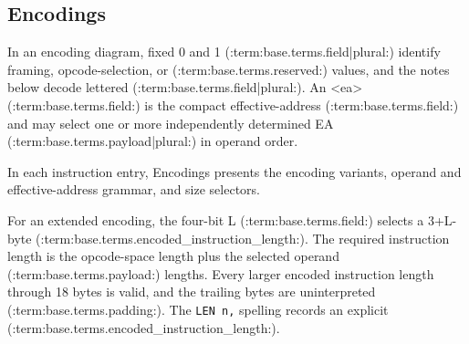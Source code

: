 \subsection*{Encodings}
In an encoding diagram, fixed 0 and 1 (:term:base.terms.field|plural:) identify framing, opcode-selection, or (:term:base.terms.reserved:) values, and the notes
below decode lettered (:term:base.terms.field|plural:). An <ea> (:term:base.terms.field:) is the compact effective-address (:term:base.terms.field:) and may select one or more
independently determined EA (:term:base.terms.payload|plural:) in operand order.

In each instruction entry, Encodings presents the encoding variants, operand and
effective-address grammar, and size selectors.

For an extended encoding, the four-bit L (:term:base.terms.field:) selects a 3+L-byte (:term:base.terms.encoded_instruction_length:). The required
instruction length is the opcode-space length plus the selected operand (:term:base.terms.payload:) lengths. Every larger encoded
instruction length through 18 bytes is valid, and the trailing bytes are uninterpreted (:term:base.terms.padding:). The
\texttt{LEN n,} spelling records an explicit (:term:base.terms.encoded_instruction_length:).
\endgroup
\clearpage

